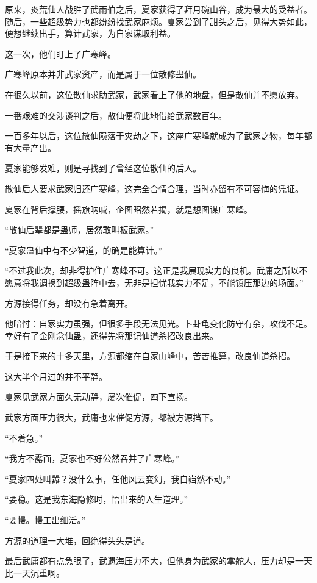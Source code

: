 \begin{this_body}
原来，炎荒仙人战胜了武雨伯之后，夏家获得了拜月碗山谷，成为最大的受益者。随后，一些超级势力也都纷纷找武家麻烦。夏家尝到了甜头之后，见得大势如此，便想继续出手，算计武家，为自家谋取利益。

这一次，他们盯上了广寒峰。

广寒峰原本并非武家资产，而是属于一位散修蛊仙。

在很久以前，这位散仙求助武家，武家看上了他的地盘，但是散仙并不愿放弃。

一番艰难的交涉谈判之后，散仙便将此地借给武家数百年。

一百多年以后，这位散仙陨落于灾劫之下，这座广寒峰就成为了武家之物，每年都有大量产出。

夏家能够发难，则是寻找到了曾经这位散仙的后人。

散仙后人要求武家归还广寒峰，这完全合情合理，当时亦留有不可容悔的凭证。

夏家在背后撑腰，摇旗呐喊，企图昭然若揭，就是想图谋广寒峰。

“散仙后辈都是蛊师，居然敢叫板武家。”

“夏家蛊仙中有不少智道，的确是能算计。”

“不过我此次，却非得护住广寒峰不可。这正是我展现实力的良机。武庸之所以不愿意将我调换到超级蛊阵中去，无非是担忧我实力不足，不能镇压那边的场面。”

方源接得任务，却没有急着离开。

他暗忖：自家实力虽强，但很多手段无法见光。卜卦龟变化防守有余，攻伐不足。幸好有了金刚念仙蛊，还得先将那记仙道杀招改良出来。

于是接下来的十多天里，方源都缩在自家山峰中，苦苦推算，改良仙道杀招。

这大半个月过的并不平静。

夏家见武家方面久无动静，屡次催促，四下宣扬。

武家方面压力很大，武庸也来催促方源，都被方源挡下。

“不着急。”

“我方不露面，夏家也不好公然吞并了广寒峰。”

“夏家四处叫嚣？没什么事，任他风云变幻，我自岿然不动。”

“要稳。这是我东海隐修时，悟出来的人生道理。”

“要慢。慢工出细活。”

方源的道理一大堆，回绝得头头是道。

最后武庸都有点急眼了，武遗海压力不大，但他身为武家的掌舵人，压力却是一天比一天沉重啊。


\end{this_body}

